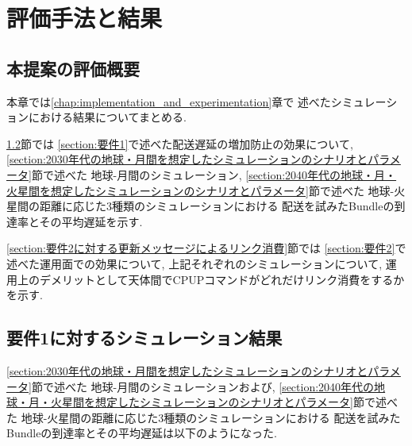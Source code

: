 \chapter{評価手法と結果}
\label{chap:evaluation}
\section{本提案の評価概要}
本章では\ref{chap:implementation_and_experimentation}章で
述べたシミュレーションにおける結果についてまとめる.

\ref{section:要件1に対するシミュレーション結果}節では
\ref{section:要件1}で述べた配送遅延の増加防止の効果について, 
\ref{section:2030年代の地球・月間を想定したシミュレーションのシナリオとパラメータ}節で述べた
地球-月間のシミュレーション, 
\ref{section:2040年代の地球・月・火星間を想定したシミュレーションのシナリオとパラメータ}節で述べた
地球-火星間の距離に応じた3種類のシミュレーションにおける
配送を試みたBundleの到達率とその平均遅延を示す. 

\ref{section:要件2に対する更新メッセージによるリンク消費}節では
\ref{section:要件2}で述べた運用面での効果について, 
上記それぞれのシミュレーションについて, 
運用上のデメリットとして天体間でCPUPコマンドがどれだけリンク消費をするかを示す. 



\section{要件1に対するシミュレーション結果}
\label{section:要件1に対するシミュレーション結果}
\ref{section:2030年代の地球・月間を想定したシミュレーションのシナリオとパラメータ}節で述べた
地球-月間のシミュレーションおよび, 
\ref{section:2040年代の地球・月・火星間を想定したシミュレーションのシナリオとパラメータ}節で述べた
地球-火星間の距離に応じた3種類のシミュレーションにおける
配送を試みたBundleの到達率とその平均遅延は以下のようになった. 



